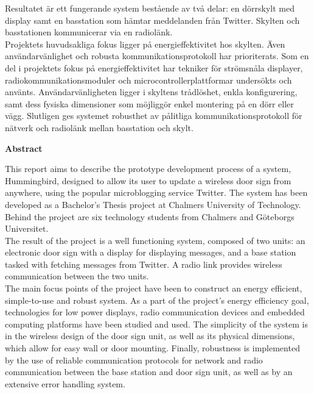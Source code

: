\documentclass[a4paper,11pt]{article}
\begin{document}
Resultatet är ett fungerande system bestående av två delar: en dörrskylt med display samt en basstation som hämtar meddelanden från Twitter. Skylten och basstationen kommunicerar via en radiolänk.\\

Projektets huvudsakliga fokus ligger på energieffektivitet hos skylten. Även användarvänlighet och robusta kommunikationsprotokoll har prioriterats. Som en del i projektets fokus på energieffektivitet har tekniker för strömsnåla displayer, radiokommunikationsmoduler och microcontrollerplattformar undersökts och använts. Användarvänligheten ligger i skyltens trådlöshet, enkla konfigurering, samt dess fysiska dimensioner som möjliggör enkel montering på en dörr eller vägg. Slutligen ges systemet robusthet av pålitliga kommunikationsprotokoll för nätverk och radiolänk mellan basstation och skylt.
	

\thispagestyle{empty}
\pagebreak

\thispagestyle{empty}
\begin{center}
{\noindent \bf Abstract}\\
\end{center}

This report aims to describe the prototype development process of a system, Hummingbird, designed to allow its user to update a wireless door sign from anywhere, using the popular microblogging service Twitter. The system has been developed as a Bachelor’s Thesis project at Chalmers University of Technology. Behind the project are six technology students from Chalmers and Göteborgs Universitet.\\

The result of the project is a well functioning system, composed of two units: an electronic door sign with a display for displaying messages, and a base station tasked with fetching messages from Twitter. A radio link provides wireless communication between the two units.\\

The main focus points of the project have been to construct an energy efficient, simple-to-use and robust system. As a part of the project’s energy efficiency goal, technologies for low power displays, radio communication devices and embedded computing platforms have been studied and used. The simplicity of the system is in the wireless design of the door sign unit, as well as its physical dimensions, which allow for easy wall or door mounting. Finally, robustness is implemented by the use of reliable communication protocols for network and radio communication between the base station and door sign unit, as well as by an extensive error handling system. 
\end{document}
